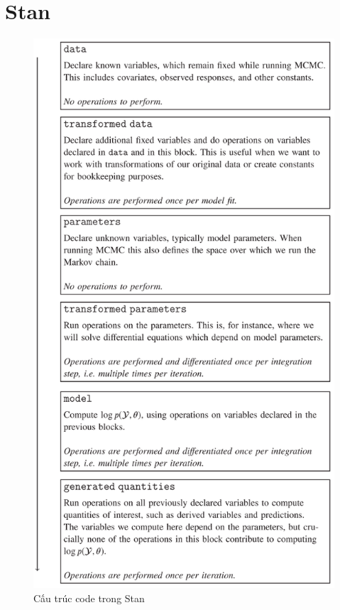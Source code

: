 \documentclass[
]{book}
\begin{document}
\hypertarget{stan}{%
\section{Stan}\label{stan}}

\begin{figure}

{\centering \includegraphics[width=1\linewidth]{figures/BayesDisTransModels_01} 

}

\caption{Cấu trúc code trong Stan}\label{fig:unnamed-chunk-10}
\end{figure}
\end{document}
